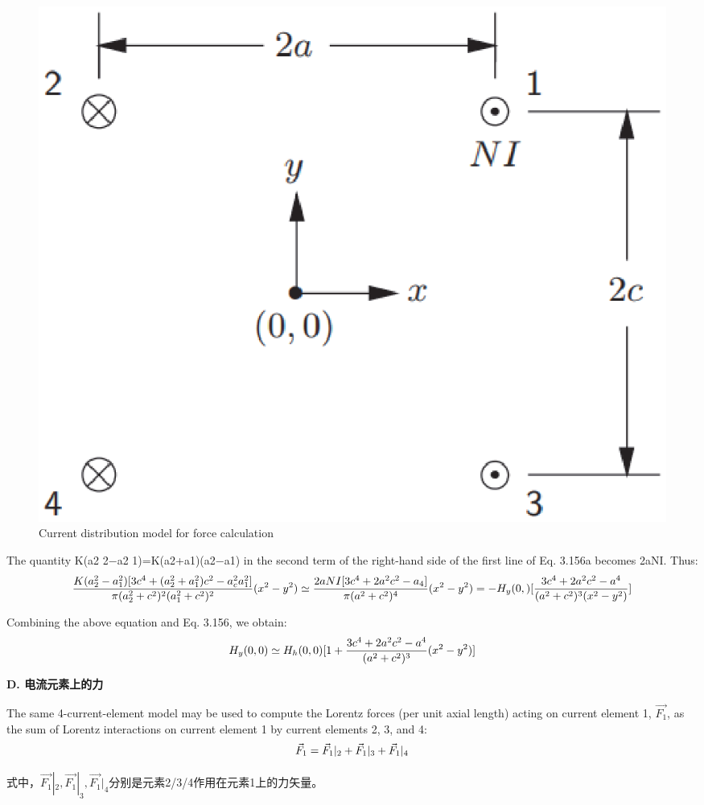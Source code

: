 \begin{figure}[htbp]
	\centering
	\includegraphics[scale=0.5]{chpt3/figs/fig3.38.eps}
	\caption{Current distribution model for force calculation}
\end{figure}

The quantity K(a2 2−a2 1)=K(a2+a1)(a2−a1) in the second term of the right-hand
side of the first line of Eq. 3.156a becomes 2aNI. Thus:
$$
\frac{K(a_{2}^{2}-a_{1}^{2})[3c^{4}+(a_{2}^{2}+a_{1}^{2})c^{2}-a_{c}^{2}a_{1}^{2}]}{\pi(a_{2}^{2}+c^{2})^{2}(a_{1}^{2}+c^{2})^{2}}(x^{2}-y^{2})\simeq\frac{2aNI[3c^{4}+2a^{2}c^{2}-a_{4}]}{\pi(a^{2}+c^{2})^{4}}(x^{2}-y^{2})\\
=-H_{y}(0,)[\frac{3c^{4}+2a^{2}c^{2}-a^{4}}{(a^{2}+c^{2})^{3}(x^{2}-y^{2})}]\\
$$

Combining the above equation and Eq. 3.156, we obtain:
$$
H_{y}(0,0)\simeq H_{h}(0,0)[1+\frac{3c^{4}+2a^{2}c^{2}-a^{4}}{(a^{2}+c^{2})^{3}}(x^{2}-y^{2})]\\%
$$

\textbf{D. 电流元素上的力}

The same 4-current-element model may be used to compute the Lorentz forces
(per unit axial length) acting on current element 1, $\vec{F_1}$, as the sum of Lorentz
interactions on current element 1 by current elements 2, 3, and 4:
$$
\vec{F}_{1}=\vec{F}_{1}|_{2}+\vec{F}_{1}|_{3}+\vec{F}_{1}|_{4}\\%
$$

式中，$\vec{F_1}|_2, \vec{F_1}|_3, \vec{F_1}|_4$分别是元素2/3/4作用在元素1上的力矢量。


